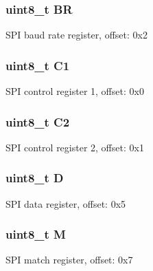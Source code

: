 \subsubsection[{B\+R}]{\setlength{\rightskip}{0pt plus 5cm}uint8\+\_\+t B\+R}\label{struct_s_p_i___mem_map_a48949110e9f7763216965bf0eef8dec2}
S\+P\+I baud rate register, offset\+: 0x2 \hypertarget{struct_s_p_i___mem_map_a8286c9d870f31a089d95e6a2285fbe2f}{}
\subsubsection[{C1}]{\setlength{\rightskip}{0pt plus 5cm}uint8\+\_\+t C1}\label{struct_s_p_i___mem_map_a8286c9d870f31a089d95e6a2285fbe2f}
S\+P\+I control register 1, offset\+: 0x0 \hypertarget{struct_s_p_i___mem_map_acdf8ac8ab339152eaed13f4eca300aa5}{}
\subsubsection[{C2}]{\setlength{\rightskip}{0pt plus 5cm}uint8\+\_\+t C2}\label{struct_s_p_i___mem_map_acdf8ac8ab339152eaed13f4eca300aa5}
S\+P\+I control register 2, offset\+: 0x1 \hypertarget{struct_s_p_i___mem_map_a42ede28e876dcdb2ce2ddd730de0401e}{}
\subsubsection[{D}]{\setlength{\rightskip}{0pt plus 5cm}uint8\+\_\+t D}\label{struct_s_p_i___mem_map_a42ede28e876dcdb2ce2ddd730de0401e}
S\+P\+I data register, offset\+: 0x5 \hypertarget{struct_s_p_i___mem_map_ae2c8107d00d3c9942e7a20fc598edecf}{}
\subsubsection[{M}]{\setlength{\rightskip}{0pt plus 5cm}uint8\+\_\+t M}\label{struct_s_p_i___mem_map_ae2c8107d00d3c9942e7a20fc598edecf}
S\+P\+I match register, offset\+: 0x7 \hypertarget{struct_s_p_i___mem_map_aef44b210af6af7cb40efdfd5469406c0}{}
